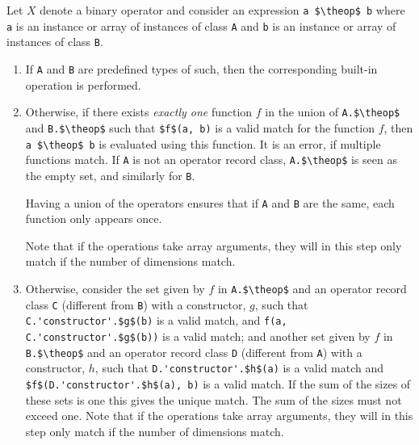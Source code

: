 \newcommand{\theop}{X}

Let $\theop$ denote a binary operator and consider an expression \lstinline!a $\theop$ b! where \lstinline!a! is an instance or array of instances of class \lstinline!A! and \lstinline!b! is an instance or array of instances of class \lstinline!B!.

\begin{enumerate}
\item\label{overloaded-binary-predefined}
  If \lstinline!A! and \lstinline!B! are predefined types of such, then the corresponding built-in operation is performed.
\item\label{overloaded-binary-unique}
  Otherwise, if there exists \emph{exactly one} function $f$ in the union of \lstinline!A.$\theop$! and \lstinline!B.$\theop$! such that \lstinline!$f$(a, b)! is a valid match for the function $f$, then \lstinline!a $\theop$ b! is evaluated using this function.
  It is an error, if multiple functions match.
  If \lstinline!A! is not an operator record class, \lstinline!A.$\theop$! is seen as the empty set, and similarly for \lstinline!B!.
  \begin{nonnormative}
  Having a union of the operators ensures that if \lstinline!A! and \lstinline!B! are the same, each function only appears once.
  \end{nonnormative}
  Note that if the operations take array arguments, they will in this step only match if the number of dimensions match.
\item
  Otherwise, consider the set given by $f$ in \lstinline!A.$\theop$! and an operator record class \lstinline!C! (different from \lstinline!B!) with a constructor, $g$, such that
  \lstinline!C.'constructor'.$g$(b)!
  is a valid match, and
  \lstinline!f(a, C.'constructor'.$g$(b))!
  is a valid match; and another set given by $f$ in \lstinline!B.$\theop$! and an operator record class \lstinline!D! (different from \lstinline!A!) with a constructor, $h$, such that
  \lstinline!D.'constructor'.$h$(a)!
  is a valid match and
  \lstinline!$f$(D.'constructor'.$h$(a), b)!
  is a valid match.
  If the sum of the sizes of these sets is one this gives the unique match.
  The sum of the sizes must not exceed one.
  Note that if the operations take array arguments, they will in this step only match if the number of dimensions match.
\begin{nonnormative}

\end{nonnormative}
\end{enumerate}
